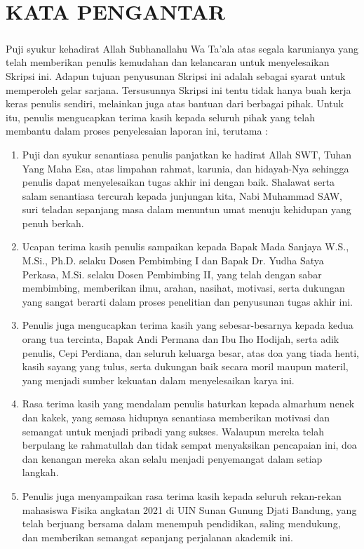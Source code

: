 \chapter*{KATA PENGANTAR} 


\paragraph{}
Puji syukur kehadirat Allah Subhanallahu Wa Ta'ala atas segala karunianya yang telah memberikan penulis kemudahan dan kelancaran untuk menyelesaikan Skripsi ini. Adapun tujuan penyusunan Skripsi ini adalah sebagai syarat untuk memperoleh gelar sarjana. Tersusunnya Skripsi ini tentu tidak hanya buah kerja keras penulis sendiri, melainkan juga atas bantuan dari berbagai pihak. Untuk itu, penulis mengucapkan terima kasih kepada seluruh pihak yang telah membantu dalam proses penyelesaian laporan ini, terutama :

\begin{enumerate}
\item Puji dan syukur senantiasa penulis panjatkan ke hadirat Allah SWT, Tuhan Yang Maha Esa, atas limpahan rahmat, karunia, dan hidayah-Nya sehingga penulis dapat menyelesaikan tugas akhir ini dengan baik. Shalawat serta salam senantiasa tercurah kepada junjungan kita, Nabi Muhammad SAW, suri teladan sepanjang masa dalam menuntun umat menuju kehidupan yang penuh berkah.

\item Ucapan terima kasih penulis sampaikan kepada Bapak Mada Sanjaya W.S., M.Si., Ph.D. selaku Dosen Pembimbing I dan Bapak Dr. Yudha Satya Perkasa, M.Si. selaku Dosen Pembimbing II, yang telah dengan sabar membimbing, memberikan ilmu, arahan, nasihat, motivasi, serta dukungan yang sangat berarti dalam proses penelitian dan penyusunan tugas akhir ini.

\item Penulis juga mengucapkan terima kasih yang sebesar-besarnya kepada kedua orang tua tercinta, Bapak Andi Permana dan Ibu Iho Hodijah, serta adik penulis, Cepi Perdiana, dan seluruh keluarga besar, atas doa yang tiada henti, kasih sayang yang tulus, serta dukungan baik secara moril maupun materil, yang menjadi sumber kekuatan dalam menyelesaikan karya ini.

\item Rasa terima kasih yang mendalam penulis haturkan kepada almarhum nenek dan kakek, yang semasa hidupnya senantiasa memberikan motivasi dan semangat untuk menjadi pribadi yang sukses. Walaupun mereka telah berpulang ke rahmatullah dan tidak sempat menyaksikan pencapaian ini, doa dan kenangan mereka akan selalu menjadi penyemangat dalam setiap langkah.

\item Penulis juga menyampaikan rasa terima kasih kepada seluruh rekan-rekan mahasiswa Fisika angkatan 2021 di UIN Sunan Gunung Djati Bandung, yang telah berjuang bersama dalam menempuh pendidikan, saling mendukung, dan memberikan semangat sepanjang perjalanan akademik ini.
\end{enumerate}

